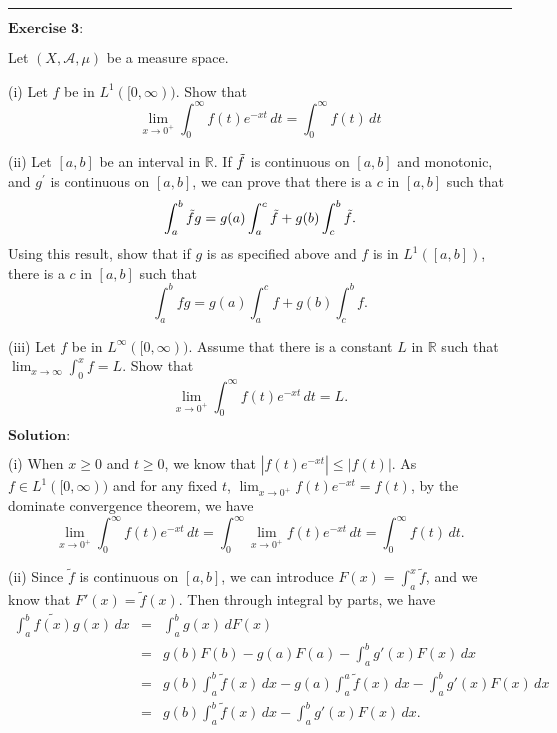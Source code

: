 \documentclass[12pt]{article}
\begin{document}
\noindent\rule[0.25\baselineskip]{\textwidth}{0.5pt}

\vspace{8pt}

$\textbf{Exercise 3:}$

Let $(X, \mathcal{A}, \mu)$ be a measure space.

(i) Let $f$ be in $L^{1}([0, \infty))$. Show that
\begin{equation*}
    \lim_{x \to 0^{+}} \int_{0}^{\infty} f(t) e^{- x t} \, d t = \int_{0}^{\infty} f(t) \, d t
\end{equation*}

(ii) Let $[a, b]$ be an interval in $\mathbb{R}$. If $\Tilde{f}$ is continuous on $[a, b]$ and monotonic, and $g^{'}$ is continuous on $[a, b]$, we can prove that there is a $c$ in $[a, b]$ such that
\begin{equation*}
    \int_{a}^{b} \Tilde{f} g = g(a) \int_{a}^{c} \Tilde{f} + g(b) \int_{c}^{b} \Tilde{f}.
\end{equation*}
Using this result, show that if $g$ is as specified above and $f$ is in $L^{1}([a, b])$, there is a $c$ in $[a, b]$ such that 
\begin{equation*}
    \int_{a}^{b} f g = g(a) \int_{a}^{c} f + g(b) \int_{c}^{b} f.
\end{equation*}

(iii) Let $f$ be in $L^{\infty}([0, \infty))$. Assume that there is a constant $L$ in $\mathbb{R}$ such that $\lim_{x \to \infty} \int_{0}^{x} f = L$. Show that 
\begin{equation*}
    \lim_{x \to 0^{+}} \int_{0}^{ \infty} f(t) e^{- x t} \, d t = L.
\end{equation*}


\vspace{8pt}
$\textbf{Solution:}$

(i) When $x \geq 0$ and $t \geq 0$, we know that $|f(t) e^{- x t}| \leq |f(t)|$. As $f \in L^{1}([0, \infty))$ and for any fixed $t$, $\lim_{x \to 0^{+}} f(t) e^{- x t} = f(t)$, by the dominate convergence theorem, we have
\begin{equation*}
    \lim_{x \to 0^{+}} \int_{0}^{\infty} f(t) e^{- x t} \, d t = \int_{0}^{\infty} \lim_{x \to 0^{+}} f(t) e^{- x t} \, d t = \int_{0}^{\infty} f(t) \, d t. 
\end{equation*}

(ii) Since $\tilde{f}$ is continuous on $[a, b]$, we can introduce $F(x) = \int_{a}^{x} \tilde{f}$, and we know that $F'(x) = \tilde{f}(x)$. Then through integral by parts, we have 
\begin{eqnarray*}
\int_{a}^{b} \tilde{f(x)} g(x) \, d x & = & \int_{a}^{b} g(x) \, d F(x) \\
& = & g(b) F(b) - g(a) F(a) - \int_{a}^{b} g'(x) F(x) \, d x  \\
& = & g(b) \int_{a}^{b} \tilde{f} (x) \, d x - g(a) \int_{a}^{a} \tilde{f} (x) \, d x - \int_{a}^{b} g'(x) F(x) \, d x  \\
& = &  g(b) \int_{a}^{b} \tilde{f} (x) \, d x - \int_{a}^{b} g'(x) F(x) \, d x.
\end{eqnarray*}
\end{document}

